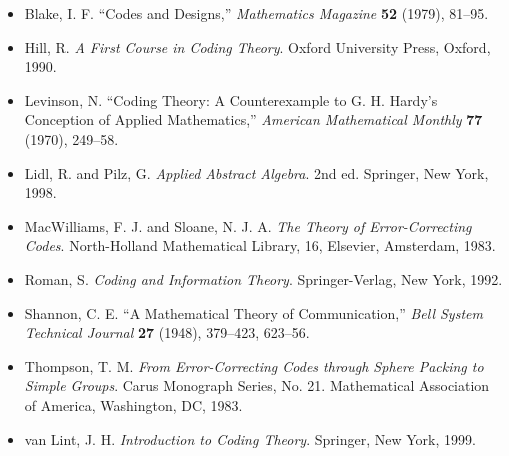 {\small
\begin{itemize}
 
\item[{\bf [1]}]
Blake, I. F. ``Codes and Designs,'' {\it Mathematics Magazine} {\bf
52} (1979), 81--95. 
 
\item[{\bf [2]}] %
Hill, R. {\it A First Course in Coding Theory}. Oxford University
Press, Oxford, 1990. 
 
\item[{\bf [3]}]
Levinson, N. ``Coding Theory: A Counterexample to G. H. Hardy's
Conception of Applied Mathematics,'' {\it American Mathematical
Monthly} {\bf 77} (1970), 249--58. 
 
\item[{ \bf [4]}]  %
Lidl, R. and Pilz, G. 
{\it Applied Abstract Algebra}. 2nd ed. Springer,
New York, 1998. 
 
\item[{\bf [5]}] %
MacWilliams, F. J. and Sloane, N. J. A. 
{\it The Theory of Error-Correcting Codes}. 
North-Holland Mathematical Library, 16,
Elsevier, Amsterdam, 1983. 
 
 
\item[{\bf [6]}]
Roman, S. {\it Coding and Information Theory}. Springer-Verlag,
New York, 1992. 
 
 
\item[{\bf [7]}]
Shannon, C. E. ``A Mathematical Theory of Communication,'' {\it Bell
System Technical Journal} {\bf 27} (1948), 379--423, 623--56.
 
\item[{\bf [8]}]
Thompson, T. M. {\it From Error-Correcting Codes through Sphere
Packing to Simple Groups}. Carus Monograph Series, No. 21. Mathematical
Association of America, Washington, DC, 1983. 
 
\item[{\bf [9]}] %
van Lint, J. H. {\it Introduction to Coding Theory}. Springer,
New York, 1999. 
 
\end{itemize}
}
 
 
 
 
 
 
